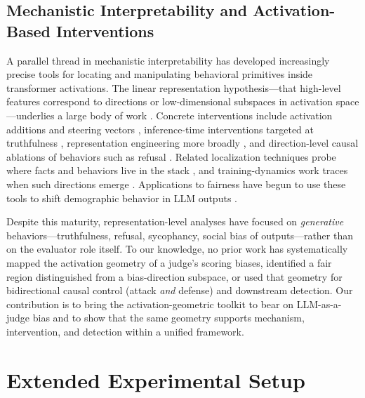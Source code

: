 \documentclass[11pt]{article}
\begin{document}
\subsection{Mechanistic Interpretability and Activation-Based Interventions}
\label{app:related_activation}

A parallel thread in mechanistic interpretability has developed increasingly precise tools for locating and manipulating behavioral primitives inside transformer activations. The linear representation hypothesis---that high-level features correspond to directions or low-dimensional subspaces in activation space---underlies a large body of work \citep{park2024linear,marks2024geometry,burns2023discovering,bricken2023monosemanticity,templeton2024scaling}. Concrete interventions include activation additions and steering vectors \citep{turner2023activation,subramani2022extracting,panickssery2024steering}, inference-time interventions targeted at truthfulness \citep{li2023inference}, representation engineering more broadly \citep{zou2023representation,bartoszcze2025representation,dubey2025activation}, and direction-level causal ablations of behaviors such as refusal \citep{arditi2024refusal}. Related localization techniques probe where facts and behaviors live in the stack \citep{meng2022locating,hernandez2023inspecting,azaria2023internal}, and training-dynamics work traces when such directions emerge \citep{nanda2023progress,nanda2023emergent}. Applications to fairness have begun to use these tools to shift demographic behavior in LLM outputs \citep{siddique2025shifting}.

Despite this maturity, representation-level analyses have focused on \emph{generative} behaviors---truthfulness, refusal, sycophancy, social bias of outputs---rather than on the evaluator role itself. To our knowledge, no prior work has systematically mapped the activation geometry of a judge's scoring biases, identified a fair region distinguished from a bias-direction subspace, or used that geometry for bidirectional causal control (attack \emph{and} defense) and downstream detection. Our contribution is to bring the activation-geometric toolkit to bear on LLM-as-a-judge bias and to show that the same geometry supports mechanism, intervention, and detection within a unified framework.


\section{Extended Experimental Setup}
\label{app:setup}
\end{document}
